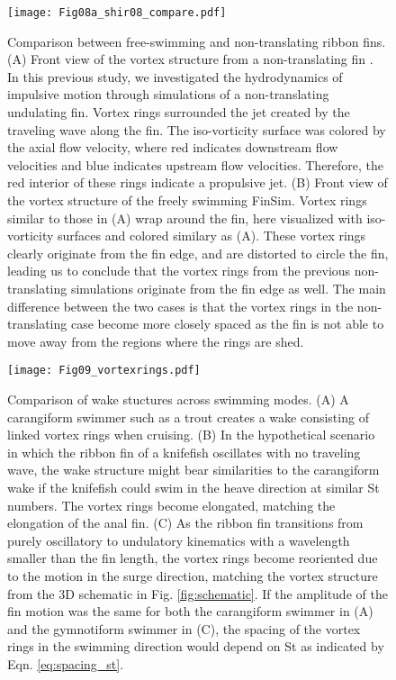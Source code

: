\documentclass[onecolumn]{IEEEtran}
\begin{document}
\begin{figure}
\centering
\texttt{[image: Fig08a\_shir08\_compare.pdf]}
\caption{ Comparison between free-swimming and non-translating ribbon fins.
(A) Front view of the vortex structure from a non-translating fin \citep*{Shir08a}. In
this previous study, we investigated the hydrodynamics of impulsive motion
through simulations of a non-translating undulating fin. Vortex rings
surrounded the jet created by the traveling wave along the fin. The
iso-vorticity surface was colored by the axial flow velocity, where red
indicates downstream flow velocities and blue indicates upstream flow
velocities. Therefore, the red interior of these rings indicate a
propulsive jet.
(B) Front view of the vortex structure of the freely swimming FinSim. Vortex rings 
similar to those in (A) wrap around the fin, here visualized with 
iso-vorticity surfaces and colored similary as (A). These vortex rings clearly originate
from the fin edge, and are distorted to circle the fin, leading us to
conclude that the vortex rings from the previous non-translating
simulations originate from the fin edge as well. The main difference
between the two cases is that the vortex rings in the non-translating case
become more closely spaced as the fin is not able to move away from the
regions where the rings are shed.
 }
\label{fig:front_view}
\end{figure}
\clearpage
\newpage

\begin{figure}
\centering
\texttt{[image: Fig09\_vortexrings.pdf]}
\caption{ Comparison of wake stuctures across swimming modes.
(A) A carangiform swimmer such as a trout creates a wake consisting of
linked vortex rings when cruising.
(B) In the hypothetical scenario in which the ribbon fin of a knifefish
oscillates with no traveling wave, the wake structure might bear
similarities to the carangiform wake if the knifefish could swim in the
heave direction at similar St numbers. The vortex rings become elongated,
matching the elongation of the anal fin.
(C) As the ribbon fin transitions from purely oscillatory to undulatory
kinematics with a wavelength smaller than the fin length, the vortex rings
become reoriented due to the motion in the surge direction, matching the
vortex structure from the 3D schematic in Fig. \ref{fig:schematic}. If the
amplitude of the fin motion was the same for both the carangiform swimmer
in (A) and the gymnotiform swimmer in (C), the spacing of the vortex rings
in the swimming direction would depend on St as indicated by Eqn.
\ref{eq:spacing_st}.
 }
\label{fig:vortexrings}
\end{figure}
\clearpage
\newpage
\end{document}
